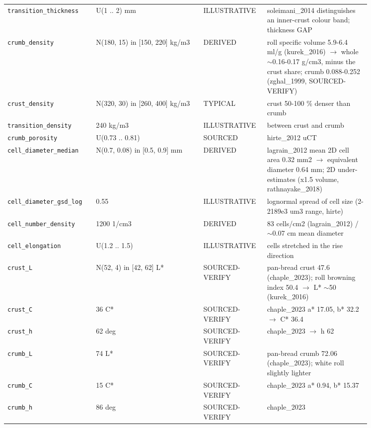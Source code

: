 \documentclass[10.5pt,a4paper]{article}
\begin{document}
{\begin{longtable}{@{}p{0.2\linewidth}p{0.27\linewidth}p{0.12\linewidth}p{0.26\linewidth}@{}}
\texttt{transition\_\allowbreak{}thickness} & U(1 .. 2) mm & ILLUSTRATIVE & soleimani\_2014 distinguishes an inner-crust colour band; thickness GAP \\
\texttt{crumb\_\allowbreak{}density} & N(180, 15) in [150, 220] kg/m3 & DERIVED & roll specific volume 5.9-6.4 ml/g (kurek\_2016) $\to$ whole $\sim$0.16-0.17 g/cm3, minus the crust share; crumb 0.088-0.252 (zghal\_1999, SOURCED-VERIFY) \\
\texttt{crust\_\allowbreak{}density} & N(320, 30) in [260, 400] kg/m3 & TYPICAL & crust 50-100 \% denser than crumb \\
\texttt{transition\_\allowbreak{}density} & 240 kg/m3 & ILLUSTRATIVE & between crust and crumb \\
\texttt{crumb\_\allowbreak{}porosity} & U(0.73 .. 0.81) & SOURCED & hirte\_2012 uCT \\
\texttt{cell\_\allowbreak{}diameter\_\allowbreak{}median} & N(0.7, 0.08) in [0.5, 0.9] mm & DERIVED & lagrain\_2012 mean 2D cell area 0.32 mm2 $\to$ equivalent diameter 0.64 mm; 2D under-estimates (x1.5 volume, rathnayake\_2018) \\
\texttt{cell\_\allowbreak{}diameter\_\allowbreak{}gsd\_\allowbreak{}log} & 0.55 & ILLUSTRATIVE & lognormal spread of cell size (2-2189e3 um3 range, hirte) \\
\texttt{cell\_\allowbreak{}number\_\allowbreak{}density} & 1200 1/cm3 & DERIVED & 83 cells/cm2 (lagrain\_2012) / $\sim$0.07 cm mean diameter \\
\texttt{cell\_\allowbreak{}elongation} & U(1.2 .. 1.5) & ILLUSTRATIVE & cells stretched in the rise direction \\
\texttt{crust\_\allowbreak{}L} & N(52, 4) in [42, 62] L* & SOURCED-VERIFY & pan-bread crust 47.6 (chaple\_2023); roll browning index 50.4 $\to$ L* $\sim$50 (kurek\_2016) \\
\texttt{crust\_\allowbreak{}C} & 36 C* & SOURCED-VERIFY & chaple\_2023 a* 17.05, b* 32.2 $\to$ C* 36.4 \\
\texttt{crust\_\allowbreak{}h} & 62 deg & SOURCED-VERIFY & chaple\_2023 $\to$ h 62 \\
\texttt{crumb\_\allowbreak{}L} & 74 L* & SOURCED-VERIFY & pan-bread crumb 72.06 (chaple\_2023); white roll slightly lighter \\
\texttt{crumb\_\allowbreak{}C} & 15 C* & SOURCED-VERIFY & chaple\_2023 a* 0.94, b* 15.37 \\
\texttt{crumb\_\allowbreak{}h} & 86 deg & SOURCED-VERIFY & chaple\_2023 \\

\end{longtable}}
\end{document}
